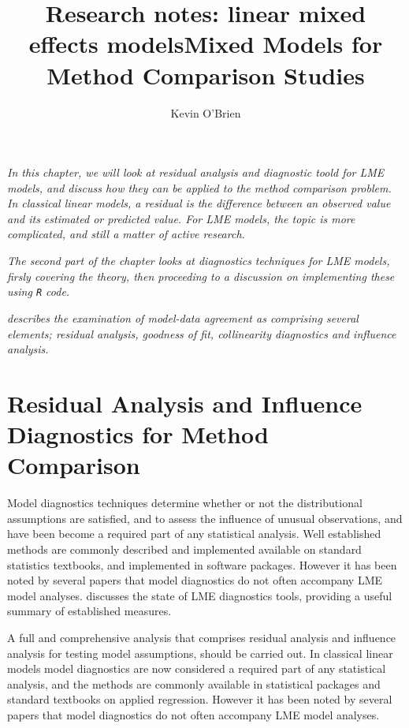 \documentclass[12pt, a4paper]{report}
\title{Research notes: linear mixed effects models}
\author{ } \date{ }
\theoremstyle{plain}
\theoremstyle{definition}
\theoremstyle{remark}
\begin{document}
	\author{Kevin O'Brien}
	\title{Mixed Models for Method Comparison Studies}
	\tableofcontents
	
\newpage
\textit{In this chapter, we will look at residual analysis and diagnostic toold for LME models, and discuss how they can be applied to the method comparison problem.	In classical linear models, a residual is the difference between an observed value and its estimated or predicted value. For LME models, the topic is more complicated, and still a matter of active research. }

\emph{The second part of the chapter looks at diagnostics techniques for LME models, firsly covering the theory, then proceeding to a discussion on 
	implementing these using \texttt{R} code.}

\emph{\citet{schabenberger} describes the examination of model-data agreement as comprising several elements; residual analysis, goodness of fit, collinearity diagnostics and influence analysis.}	

\newpage
	\chapter{Residual Analysis and Influence Diagnostics for Method Comparison}
	
Model diagnostics techniques determine whether or not the distributional assumptions are satisfied, and to assess the influence of unusual observations, and have been become a required part of any statistical analysis. Well established methods are commonly described and implemented available on standard statistics textbooks, and implemented in software packages. However it has been noted by several papers that model diagnostics do not often accompany LME model analyses. \citet{schabenberger} discusses the state of LME diagnostics tools, providing a useful summary of established measures.
	
	A full and comprehensive
	analysis that comprises residual analysis and influence analysis for testing model assumptions, should be carried out.  In classical linear models model diagnostics are now considered a required part of any statistical analysis, and the methods are commonly available in statistical packages and standard textbooks on applied regression. However it has been noted by several papers \citep{Christensen, schabenberger} that model diagnostics do not often accompany LME model analyses.
	
\end{document}

